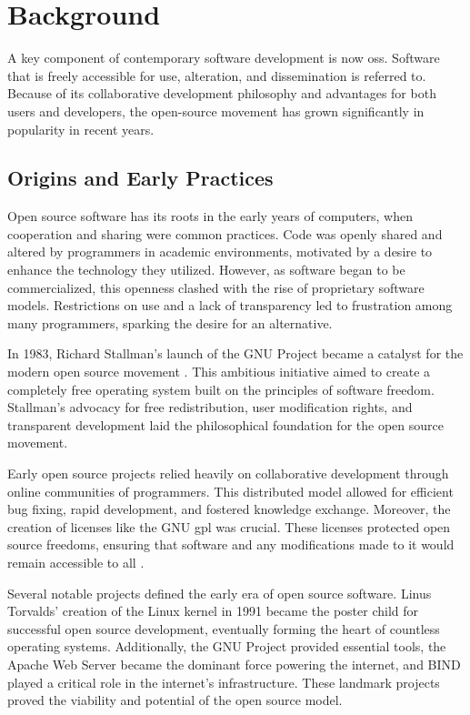 \section{Background}

A key component of contemporary software development is now \ac{oss}. Software that is freely accessible for use, alteration, and dissemination is referred to. Because of its collaborative development philosophy and advantages for both users and developers, the open-source movement has grown significantly in popularity in recent years.

\subsection{Origins and Early Practices}

Open source software has its roots in the early years of computers, when cooperation and sharing were common practices. Code was openly shared and altered by programmers in academic environments, motivated by a desire to enhance the technology they utilized. However, as software began to be commercialized, this openness clashed with the rise of proprietary software models. Restrictions on use and a lack of transparency led to frustration among many programmers, sparking the desire for an alternative.

In 1983, Richard Stallman's launch of the GNU Project became a catalyst for the modern open source movement \cite{dibona1999open}.  This ambitious initiative aimed to create a completely free operating system built on the principles of software freedom.  Stallman's advocacy for free redistribution, user modification rights, and transparent development laid the philosophical foundation for the open source movement.

Early open source projects relied heavily on collaborative development through online communities of programmers. This distributed model allowed for efficient bug fixing, rapid development, and fostered knowledge exchange.  Moreover, the creation of licenses like the GNU \ac{gpl} was crucial. These licenses protected open source freedoms, ensuring that software and any modifications made to it would remain accessible to all \cite{license1989gnu}.


Several notable projects defined the early era of open source software. Linus Torvalds' creation of the Linux kernel in 1991 became the poster child for successful open source development, eventually forming the heart of countless operating systems. Additionally, the GNU Project provided essential tools, the Apache Web Server became the dominant force powering the internet, and BIND played a critical role in the internet's infrastructure. These landmark projects proved the viability and potential of the open source model.


